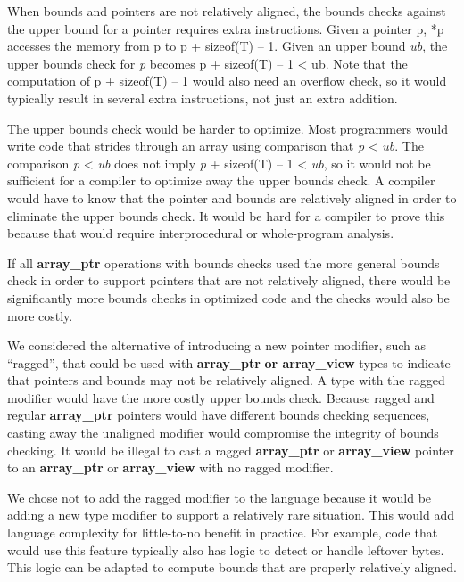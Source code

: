 \documentclass[]{article}
\begin{document}
When bounds and pointers are not relatively aligned, the bounds checks
against the upper bound for a pointer requires extra instructions. Given
a pointer p, *p accesses the memory from p to p + sizeof(T) -- 1. Given
an upper bound \emph{ub}, the upper bounds check for \emph{p} becomes p
+ sizeof(T) -- 1 \textless{} ub. Note that the computation of p +
sizeof(T) -- 1 would also need an overflow check, so it would typically
result in several extra instructions, not just an extra addition.

The upper bounds check would be harder to optimize. Most programmers
would write code that strides through an array using comparison that
\emph{p} \textless{} \emph{ub}. The comparison \emph{p} \textless{}
\emph{ub} does not imply \emph{p} + sizeof(T) -- 1 \textless{}
\emph{ub}, so it would not be sufficient for a compiler to optimize away
the upper bounds check. A compiler would have to know that the pointer
and bounds are relatively aligned in order to eliminate the upper bounds
check. It would be hard for a compiler to prove this because that would
require interprocedural or whole-program analysis.

If all \textbf{array\_ptr} operations with bounds checks used the more
general bounds check in order to support pointers that are not
relatively aligned, there would be significantly more bounds checks in
optimized code and the checks would also be more costly.

We considered the alternative of introducing a new pointer modifier,
such as ``ragged'', that could be used with \textbf{array\_ptr}
\textbf{or array\_view} types to indicate that pointers and bounds may
not be relatively aligned. A type with the ragged modifier would have
the more costly upper bounds check. Because ragged and regular
\textbf{array\_ptr} pointers would have different bounds checking
sequences, casting away the unaligned modifier would compromise the
integrity of bounds checking. It would be illegal to cast a ragged
\textbf{array\_ptr} or \textbf{array\_view} pointer to an
\textbf{array\_ptr} or \textbf{array\_view} with no ragged modifier.

We chose not to add the ragged modifier to the language because it would
be adding a new type modifier to support a relatively rare situation.
This would add language complexity for little-to-no benefit in practice.
For example, code that would use this feature typically also has logic
to detect or handle leftover bytes. This logic can be adapted to compute
bounds that are properly relatively aligned.
\end{document}
